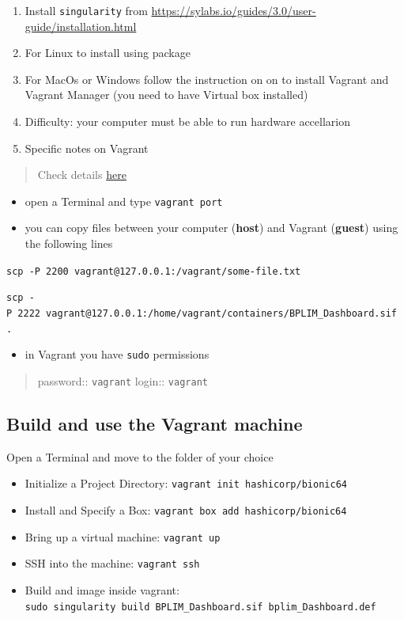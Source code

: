 \documentclass[
  12pt,
]{article}
\providecommand{\tightlist}{%
  \setlength{\itemsep}{0pt}\setlength{\parskip}{0pt}}
\begin{document}
\begin{enumerate}
\def\labelenumi{\arabic{enumi}.}
\item
  Install \texttt{singularity} from
  \url{https://sylabs.io/guides/3.0/user-guide/installation.html}
\item
  For Linux to install using package
\item
  For MacOs or Windows follow the instruction on on to install Vagrant
  and Vagrant Manager (you need to have Virtual box installed)
\item
  Difficulty: your computer must be able to run hardware accellarion
\item
  Specific notes on Vagrant
\end{enumerate}

\begin{quote}
Check details
\href{https://techtldr.com/how-to-copy-one-file-from-vagrant-virtual-machine-to-local-host/}{here}
\end{quote}

\begin{itemize}
\item
  open a Terminal and type \texttt{vagrant\ port}
\item
  you can copy files between your computer (\textbf{host}) and Vagrant
  (\textbf{guest}) using the following lines
\end{itemize}

\texttt{scp\ -P\ 2200\ vagrant@127.0.0.1:/vagrant/some-file.txt}

\texttt{scp\ -P\ 2222\ vagrant@127.0.0.1:/home/vagrant/containers/BPLIM\_Dashboard.sif\ .}

\begin{itemize}
\tightlist
\item
  in Vagrant you have \texttt{sudo} permissions
\end{itemize}

\begin{quote}
password:: \texttt{vagrant} login:: \texttt{vagrant}
\end{quote}

\hypertarget{build-and-use-the-vagrant-machine}{%
\subsection{Build and use the Vagrant
machine}\label{build-and-use-the-vagrant-machine}}

Open a Terminal and move to the folder of your choice

\begin{itemize}
\item
  Initialize a Project Directory:
  \texttt{vagrant\ init\ hashicorp/bionic64}
\item
  Install and Specify a Box:
  \texttt{vagrant\ box\ add\ hashicorp/bionic64}
\item
  Bring up a virtual machine: \texttt{vagrant\ up}
\item
  SSH into the machine: \texttt{vagrant\ ssh}
\item
  Build and image inside vagrant:
  \texttt{sudo\ singularity\ build\ BPLIM\_Dashboard.sif\ bplim\_Dashboard.def}
\end{itemize}
\end{document}
